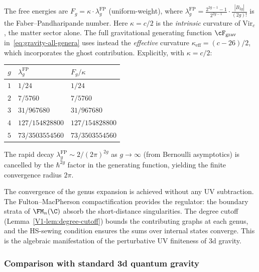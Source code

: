 The free energies are $F_g = \kappa \cdot
\lambda_g^{\mathrm{FP}}$
\textup{(}uniform-weight\textup{)}, where
$\lambda_g^{\mathrm{FP}}
= \frac{2^{2g-1}-1}{2^{2g-1}} \cdot \frac{|B_{2g}|}{(2g)!}$
is the Faber--Pandharipande number.
Here $\kappa = c/2$ is the \emph{intrinsic} curvature of
$\mathrm{Vir}_c$, the matter sector alone. The full
gravitational generating function
$\cF_{\mathrm{grav}}$ in~\eqref{eq:gravity-all-genera} uses
instead the \emph{effective} curvature
$\kappa_{\mathrm{eff}} = (c - 26)/2$, which incorporates the
ghost contribution. Explicitly, with $\kappa = c/2$:

\begin{center}
\small
\renewcommand{\arraystretch}{1.15}
\begin{tabular}{c|l|l}
$g$ & $\lambda_g^{\mathrm{FP}}$
 & $F_g / \kappa$ \\
\hline
$1$ & $1/24$ & $1/24$ \\[2pt]
$2$ & $7/5760$ & $7/5760$ \\[2pt]
$3$ & $31/967680$ & $31/967680$ \\[2pt]
$4$ & $127/154828800$ & $127/154828800$ \\[2pt]
$5$ & $73/3503554560$ & $73/3503554560$
\end{tabular}
\end{center}

\noindent
The rapid decay $\lambda_g^{\mathrm{FP}} \sim 2/(2\pi)^{2g}$
as $g \to \infty$ (from Bernoulli asymptotics) is
cancelled by the $\hbar^{2g}$ factor in the generating
function, yielding the finite convergence radius $2\pi$.

\begin{remark}[No UV renormalization]
\label{rem:gravity-no-uv}
The convergence of the genus expansion is achieved without any
UV subtraction. The Fulton--MacPherson compactification provides
the regulator: the boundary strata of $\FM_n(\C)$ absorb the
short-distance singularities. The degree cutoff
(Lemma~\ref{V1-lem:degree-cutoff}) bounds the contributing graphs
at each genus, and the HS-sewing condition ensures the sums over
internal states converge. This is the algebraic manifestation of
the perturbative UV finiteness of 3d gravity.
\end{remark}

\subsubsection*{Comparison with standard 3d quantum gravity}

